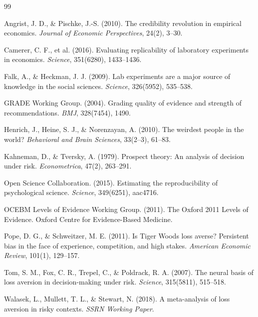 \documentclass[11pt,a4paper]{article}
\theoremstyle{remark}
\begin{document}

\newpage


\begin{thebibliography}{99}

Angrist, J. D., \& Pischke, J.-S. (2010).
The credibility revolution in empirical economics.
\textit{Journal of Economic Perspectives}, 24(2), 3--30.

Camerer, C. F., et al. (2016).
Evaluating replicability of laboratory experiments in economics.
\textit{Science}, 351(6280), 1433--1436.

Falk, A., \& Heckman, J. J. (2009).
Lab experiments are a major source of knowledge in the social sciences.
\textit{Science}, 326(5952), 535--538.

GRADE Working Group. (2004).
Grading quality of evidence and strength of recommendations.
\textit{BMJ}, 328(7454), 1490.

Henrich, J., Heine, S. J., \& Norenzayan, A. (2010).
The weirdest people in the world?
\textit{Behavioral and Brain Sciences}, 33(2--3), 61--83.

Kahneman, D., \& Tversky, A. (1979).
Prospect theory: An analysis of decision under risk.
\textit{Econometrica}, 47(2), 263--291.

Open Science Collaboration. (2015).
Estimating the reproducibility of psychological science.
\textit{Science}, 349(6251), aac4716.

OCEBM Levels of Evidence Working Group. (2011).
The Oxford 2011 Levels of Evidence.
Oxford Centre for Evidence-Based Medicine.

Pope, D. G., \& Schweitzer, M. E. (2011).
Is Tiger Woods loss averse? Persistent bias in the face of experience, competition, and high stakes.
\textit{American Economic Review}, 101(1), 129--157.

Tom, S. M., Fox, C. R., Trepel, C., \& Poldrack, R. A. (2007).
The neural basis of loss aversion in decision-making under risk.
\textit{Science}, 315(5811), 515--518.

Walasek, L., Mullett, T. L., \& Stewart, N. (2018).
A meta-analysis of loss aversion in risky contexts.
\textit{SSRN Working Paper}.

\end{thebibliography}
\end{document}
